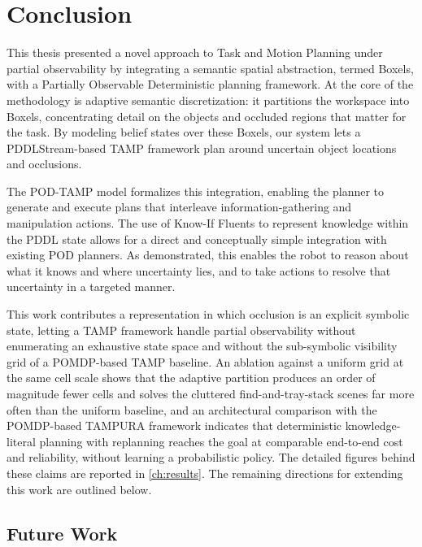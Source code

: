
\chapter{Conclusion}
\label{ch:conclusion}

This thesis presented a novel approach to Task and Motion Planning under partial observability by integrating a semantic spatial abstraction, termed Boxels, with a Partially Observable Deterministic planning framework. At the core of the methodology is adaptive semantic discretization: it partitions the workspace into Boxels, concentrating detail on the objects and occluded regions that matter for the task. By modeling belief states over these Boxels, our system lets a PDDLStream-based TAMP framework plan around uncertain object locations and occlusions.

The POD-TAMP model formalizes this integration, enabling the planner to generate and execute plans that interleave information-gathering and manipulation actions. The use of Know-If Fluents to represent knowledge within the PDDL state allows for a direct and conceptually simple integration with existing POD planners. As demonstrated, this enables the robot to reason about what it knows and where uncertainty lies, and to take actions to resolve that uncertainty in a targeted manner.

This work contributes a representation in which occlusion is an explicit symbolic state, letting a TAMP framework handle partial observability without enumerating an exhaustive state space and without the sub-symbolic visibility grid of a POMDP-based TAMP baseline. An ablation against a uniform grid at the same cell scale shows that the adaptive partition produces an order of magnitude fewer cells and solves the cluttered find-and-tray-stack scenes far more often than the uniform baseline, and an architectural comparison with the POMDP-based TAMPURA framework indicates that deterministic knowledge-literal planning with replanning reaches the goal at comparable end-to-end cost and reliability, without learning a probabilistic policy. The detailed figures behind these claims are reported in \cref{ch:results}. The remaining directions for extending this work are outlined below.

\section{Future Work}
\label{sec:future_work}

